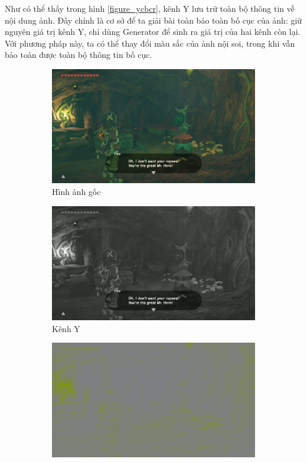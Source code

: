\documentclass[12pt]{extreport}
\begin{document}
Như có thể thấy trong hình \ref{figure_ycbcr}, kênh Y lưu trữ toàn bộ thông tin về nội dung ảnh. Đây chính là cơ sở để ta giải bài toàn bảo toàn bố cục của ảnh: giữ nguyên giá trị kênh Y, chỉ dùng Generator để sinh ra giá trị của hai kênh còn lại. Với phương pháp này, ta có thể thay đổi màu sắc của ảnh nội soi, trong khi vẫn bảo toàn được toàn bộ thông tin bố cục.

\begin{figure}[H]
    \centering
    \begin{subfigure}[H]{\textwidth}
        \centering
        \includegraphics[width=0.3\linewidth]{figure29.jpg}
        \caption{Hình ảnh gốc}
    \end{subfigure}
    \begin{subfigure}[H]{0.3\textwidth}
        \centering
        \includegraphics[width=\linewidth]{figure30.png}
        \caption{Kênh Y}
    \end{subfigure}
    \begin{subfigure}[H]{0.3\textwidth}
        \centering
        \includegraphics[width=\linewidth]{figure31.png}

\end{subfigure}
\end{figure}
\end{document}
